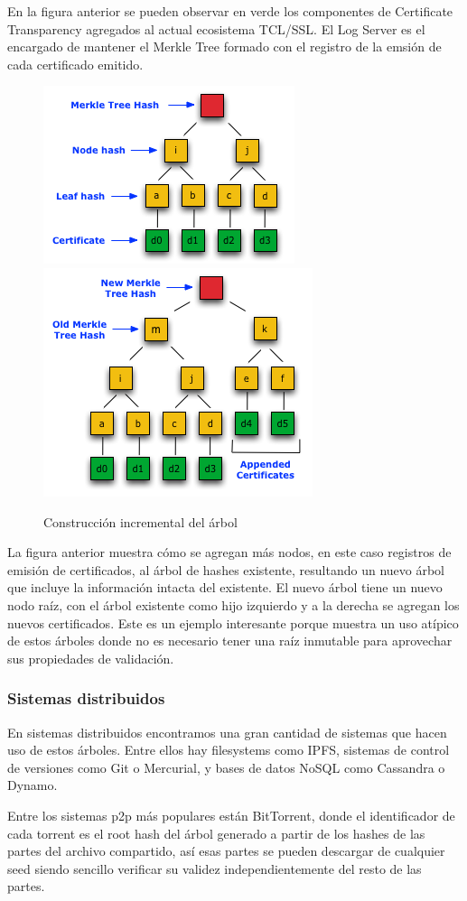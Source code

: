 En la figura anterior se pueden observar en verde los componentes de Certificate Transparency agregados al actual ecosistema TCL/SSL. El Log Server es el encargado de mantener el Merkle Tree formado con el registro de la emsión de cada certificado emitido.

\begin{figure}[H]
  \centering
  \includegraphics[width=.3\linewidth]{imagenes/ct_hash_1.png}
  \includegraphics[width=.3\linewidth]{imagenes/ct_hash_2.png}
  \caption{Construcci\'on incremental del \'arbol}
\end{figure}

La figura anterior muestra cómo se agregan más nodos, en este caso registros de emisión de certificados, al árbol de hashes existente, resultando un nuevo árbol que incluye la información intacta del existente. El nuevo árbol tiene un nuevo nodo raíz, con el árbol existente como hijo izquierdo y a la derecha se agregan los nuevos certificados. Este es un ejemplo interesante porque muestra un uso atípico de estos árboles donde no es necesario tener una raíz inmutable para aprovechar sus propiedades de validación.


\subsubsection{Sistemas distribuidos}

En sistemas distribuidos encontramos una gran cantidad de sistemas que hacen uso de estos árboles. Entre ellos hay filesystems como IPFS, sistemas de control de versiones como Git o Mercurial, y bases de datos NoSQL como Cassandra o Dynamo.

Entre los sistemas p2p más populares están BitTorrent, donde el identificador de cada torrent es el root hash del árbol generado a partir de los hashes de las partes del archivo compartido, así esas partes se pueden descargar de cualquier seed siendo sencillo verificar su validez independientemente del resto de las partes.

